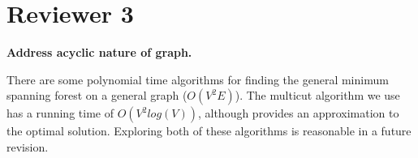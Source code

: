 \documentclass[10pt,twocolumn,letterpaper]{article}
\begin{document}
\section*{Reviewer 3}

\textbf{Address acyclic nature of graph.}

There are some polynomial time algorithms for finding the general minimum spanning forest on a general graph ($O(V^2 E)$). The multicut algorithm we use has a running time of $O(V^2 log(V))$, although provides an approximation to the optimal solution. Exploring both of these algorithms is reasonable in a future revision. 

{\small


}
\end{document}

